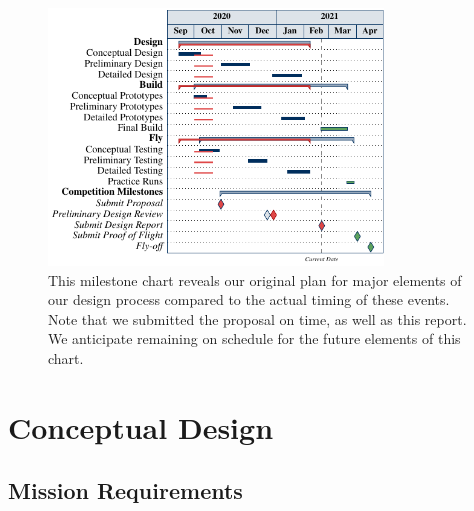 \documentclass[report]{byu-aero}
\begin{document}


\begin{figure}[h!]
	\centering
	\includegraphics[width=3.5in]{ganttchart.pdf}
	\caption{This milestone chart reveals our {\color{\BYUblue} original plan} for major elements of our design process compared to the  {\color{\BYUred} actual timing} of these events.  Note that we submitted the proposal on time, as well as this report.  We anticipate remaining on schedule for the {\color{\BYUgreen} future elements} of this chart.}
	\label{fig:plannedvsactualtiming}
\end{figure}

\section{Conceptual Design} %
\label{sec:ConceptualDesign}


\subsection{Mission Requirements}
\label{ssec:missionreqs}
\end{document}
